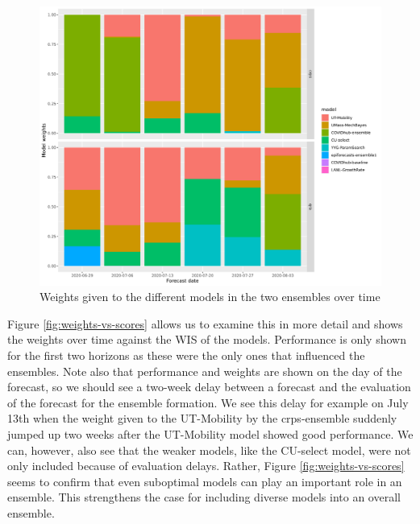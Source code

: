 \documentclass[
]{book}
\begin{document}
\begin{figure}
\includegraphics[width=1\linewidth]{../visualisation/chapter-5-results/weights-time} \caption{Weights given to the different models in the two ensembles over time}\label{fig:weights-time}
\end{figure}

Figure \ref{fig:weights-vs-scores} allows us to examine this in more detail and shows the weights over time against the WIS of the models. Performance is only shown for the first two horizons as these were the only ones that influenced the ensembles. Note also that performance and weights are shown on the day of the forecast, so we should see a two-week delay between a forecast and the evaluation of the forecast for the ensemble formation. We see this delay for example on July 13th when the weight given to the UT-Mobility by the crps-ensemble suddenly jumped up two weeks after the UT-Mobility model showed good performance. We can, however, also see that the weaker models, like the CU-select model, were not only included because of evaluation delays. Rather, Figure \ref{fig:weights-vs-scores} seems to confirm that even suboptimal models can play an important role in an ensemble. This strengthens the case for including diverse models into an overall ensemble.
\end{document}
